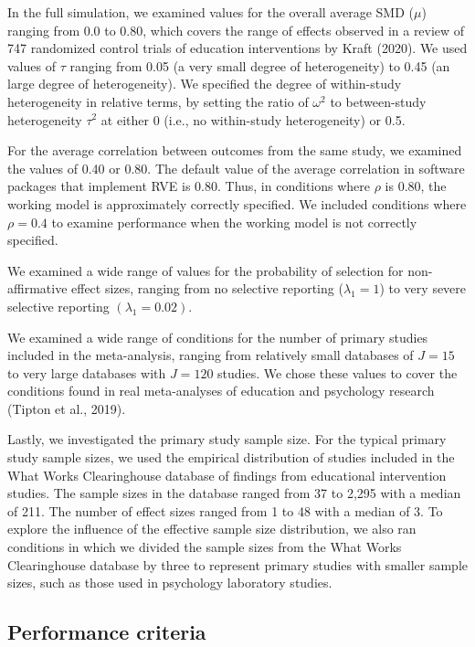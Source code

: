 \documentclass[
  man, donotrepeattitle,floatsintext]{apa7}
\begin{document}
In the full simulation, we examined values for the overall average SMD (\(\mu\)) ranging from 0.0 to 0.80, which covers the range of effects observed in a review of 747 randomized control trials of education interventions by Kraft (2020).
We used values of \(\tau\) ranging from 0.05 (a very small degree of heterogeneity) to 0.45 (an large degree of heterogeneity).
We specified the degree of within-study heterogeneity in relative terms, by setting the ratio of \(\omega^2\) to between-study heterogeneity \(\tau^2\) at either 0 (i.e., no within-study heterogeneity) or 0.5.

For the average correlation between outcomes from the same study, we
examined the values of 0.40 or 0.80. The default value of the average
correlation in software packages that implement RVE is 0.80. Thus, in
conditions where \(\rho\) is 0.80, the working model is approximately
correctly specified. We included conditions where \(\rho = 0.4\) to examine performance when the
working model is not correctly specified.

We examined a wide range of values for the probability of selection for non-affirmative effect sizes, ranging from no selective reporting (\(\lambda_1 = 1\)) to very severe selective reporting \((\lambda_1 = 0.02)\).

We examined a wide range of conditions for the number of primary studies included in the meta-analysis, ranging from relatively small databases of \(J = 15\) to very large databases with \(J = 120\) studies.
We chose these values to cover the conditions found in real meta-analyses of education and psychology research (Tipton et al., 2019).

Lastly, we investigated the primary study sample size.
For the typical primary study sample sizes, we used the empirical distribution of studies included in the What Works Clearinghouse database of findings from educational intervention studies.
The sample sizes in the database ranged from 37 to 2,295 with a median of 211.
The number of effect sizes ranged from 1 to 48 with a median of 3.
To explore the influence of the effective sample size distribution, we also ran conditions in which we divided the sample
sizes from the What Works Clearinghouse database by three to represent primary studies with smaller sample sizes,
such as those used in psychology laboratory studies.

\subsection{Performance criteria}\label{performance-criteria}
\end{document}
